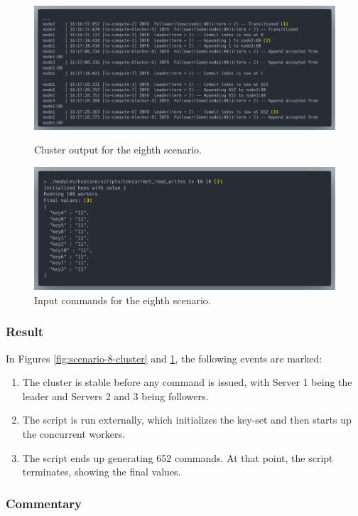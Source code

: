 \begin{figure}[!ht]
\centering
\includegraphics[width=500pt]{images/scenario_8_cluster.png}
\caption{Cluster output for the eighth scenario.}
\label{fig:scenario-8-cluster}
\includegraphics[width=500pt]{images/scenario_8_commands.png}
\caption{Input commands for the eighth scenario.}
\label{fig:scenario-8-commands}
\end{figure}

\subsubsection{Result}
In Figures \ref{fig:scenario-8-cluster} and \ref{fig:scenario-8-commands}, the following events are marked:
\begin{enumerate}
    \item The cluster is stable before any command is issued, with Server 1 being the leader and Servers 2 and 3 being followers.
    \item The script is run externally, which initializes the key-set and then starts up the concurrent workers.
    \item The script ends up generating 652 commands. At that point, the script terminates, showing the final values.
\end{enumerate}

\subsubsection{Commentary}

